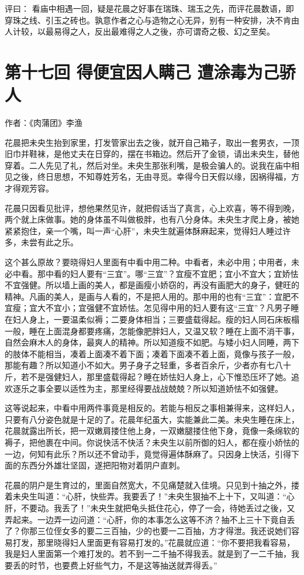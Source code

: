 \documentclass[a4paper,12pt,UTF8,twoside]{ctexbook}
\begin{document}
评曰： 看庙中相遇一回，疑是花晨之好事在瑞珠、瑞玉之先，而评花晨数语，即穿珠之线、引玉之砖也。孰意作者之心与造物之心无异，别有一种安排，决不肯由人计较，以最易得之人，反出最难得之人之後，亦可谓奇之极、幻之至矣。

\chapter{第十七回 得便宜因人瞒己 遭涂毒为己骄人}

作者：《肉蒲团》李渔

花晨把未央生抬到家里，打发管家出去之後，就开自己箱子，取出一套男衣，一顶旧巾并鞋袜，是他丈夫在日穿的，摆在书箱边。然后开了金锁，请出未央生，替他穿着。二人先见了礼，然后对坐。未央生那张利嘴，是极会骗人的。说我在庙中相见之後，终日思想，不知尊姓芳名，无由寻觅。幸得今日天假以缘，因祸得福，方才得观芳容。

花晨只因看见批评，想他果然见许，就把假话当了真言，心上欢喜，等不得到晚，两个就上床做事。她的身体虽不叫做极胖，也有八分身体。未央生才爬上身，被她紧紧抱住，亲一个嘴，叫一声“心肝”，未央生就遍体酥麻起来，觉得妇人睡过许多，未尝有此之乐。

这个甚么原故？要晓得妇人里面有中看中用二种。中看者，未必中用；中用者，未必中看。那中看的妇人要有“三宜”。哪“三宜”？宜瘦不宜肥；宜小不宜大；宜娇怯不宜强健。所以墙上画的美人，都是画瘦小娇窃的，再没有画肥大的身子，健旺的精神。凡画的美人，是画与人看的，不是把人用的。那中用的也有“三宜”：宜肥不宜瘦；宜大不宜小；宜强健不宜娇怯。怎见得中用的妇人要有这“三宜”？凡男子睡在妇人身上，一要温柔似褥；二要身体相当；三要盛载得起。瘦的妇人同石床板榻一般，睡在上面混身都要疼痛，怎能像肥胖妇人，又温又软？睡在上面不消干事，自然会麻木人的身体，最爽人的精神。所以知道瘦不如肥。与矮小妇人同睡，两下的肢体不能相当，凑着上面凑不着下面；凑着下面凑不着上面，竟像与孩子一般，那能有趣？所以知道小不如大。男子身子之轻重，多者百余斤，少者亦有七八十斤，若不是强健妇人，那里盛载得起？睡在娇怯妇人身上，心下惟恐压坏了她。追欢逐乐之事全要以适性为主，那里经得要战战兢兢？所以知道娇怯不如强健。

这等说起来，中看中用两件事竟是相反的。若能与相反之事相兼得来，这样妇人，只要有八分姿色就是十足的了。花晨年纪虽大，实能兼此二美。未央生睡在床上，花晨就露出所长，把一双嫩肩搂住他上身，一双嫩腿搂住他下身，竟像一条绵软的褥子，把他裹在中间。你说快活不快活？未央生以前所御的妇人，都在瘦小娇怯的一边，何知有此乐？所以还不曾动手，竟觉得遍体酥麻了。只因身上快活，引得下面的东西分外雄壮坚固，遂把阳物对着阴户直刺。

花晨的阴户是生育过的，里面自然宽大，不见痛楚就入佳境。只见到十抽之外，搂着未央生叫道：“心肝，快些弄。我要丢了！”未央生狠抽不上十下，又叫道：“心肝，不要动。我丢了！”未央生就把龟头抵住花心，停了一会，待她丢过之後，又弄起来。一边弄一边问道：“心肝，你的本事怎么这等不济？抽不上三十下竟自丢了？你那三位侄女多的要二三百抽，少的也要一二百抽，方才得泄。我还说她们容易打发，那里晓得妇人里面更有容易打发的。”花晨就应道：“你不要把我看容易，我是妇人里面第一个难打发的。若不到一二千抽不得我丢。就是到了一二千抽，我要丢的时节，也要费上好些气力，不是这等抽送就弄得丢。”
\end{document}
